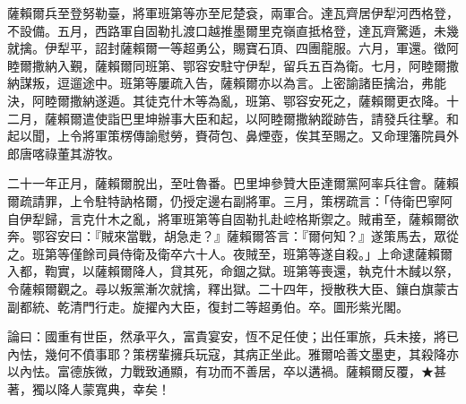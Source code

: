 \begin{pinyinscope}
薩賴爾兵至登努勒臺，將軍班第等亦至尼楚袞，兩軍合。達瓦齊居伊犁河西格登，不設備。五月，西路軍自固勒扎渡口越推墨爾里克嶺直抵格登，達瓦齊驚遁，未幾就擒。伊犁平，詔封薩賴爾一等超勇公，賜寶石頂、四團龍服。六月，軍還。徵阿睦爾撒納入覲，薩賴爾同班第、鄂容安駐守伊犁，留兵五百為衛。七月，阿睦爾撒納謀叛，逗遛途中。班第等屢疏入告，薩賴爾亦以為言。上密諭諸臣擒治，弗能決，阿睦爾撒納遂遁。其徒克什木等為亂，班第、鄂容安死之，薩賴爾更衣降。十二月，薩賴爾遣使詣巴里坤辦事大臣和起，以阿睦爾撒納蹤跡告，請發兵往擊。和起以聞，上令將軍策楞傳諭慰勞，賚荷包、鼻煙壺，俟其至賜之。又命理籓院員外郎唐喀祿董其游牧。

二十一年正月，薩賴爾脫出，至吐魯番。巴里坤參贊大臣達爾黨阿率兵往會。薩賴爾疏請罪，上令駐特訥格爾，仍授定邊右副將軍。三月，策楞疏言：「侍衛巴寧阿自伊犁歸，言克什木之亂，將軍班第等自固勒扎赴崆格斯禦之。賊甫至，薩賴爾欲奔。鄂容安曰：『賊來當戰，胡急走？』薩賴爾答言：『爾何知？』遂策馬去，眾從之。班第等僅餘司員侍衛及衛卒六十人。夜賊至，班第等遂自殺。」上命逮薩賴爾入都，鞫實，以薩賴爾降人，貸其死，命錮之獄。班第等喪還，執克什木馘以祭，令薩賴爾觀之。尋以叛黨漸次就擒，釋出獄。二十四年，授散秩大臣、鑲白旗蒙古副都統、乾清門行走。旋擢內大臣，復封二等超勇伯。卒。圖形紫光閣。

論曰：國重有世臣，然承平久，富貴宴安，恆不足任使；出任軍旅，兵未接，將已內怯，幾何不僨事耶？策楞輩擁兵玩寇，其病正坐此。雅爾哈善文墨吏，其殺降亦以內怯。富德族微，力戰致通顯，有功而不善居，卒以遘禍。薩賴爾反覆，★甚著，獨以降人蒙寬典，幸矣！


\end{pinyinscope}